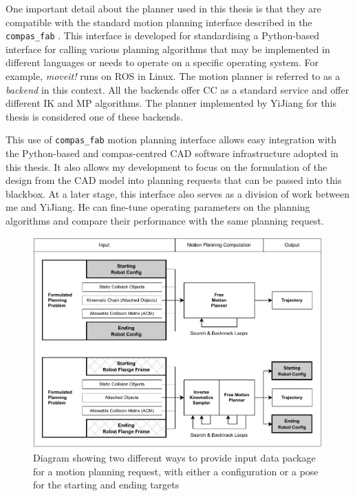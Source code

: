 One important detail about the planner used in this thesis is that they are compatible with the standard motion planning interface described in the \verb|compas_fab| \parencite{rustCOMPASFABRobotic2018}. This interface is developed for standardising a Python-based interface for calling various planning algorithms that may be implemented in different languages or needs to operate on a specific operating system. For example, \textit{moveit!} \parencite{sucanMoveit2018} runs on ROS \parencite{quigleyROSOpensourceRobot2009} in Linux. The motion planner is referred to as a \textit{backend} in this context. All the backends offer CC as a standard service and offer different IK and MP algorithms. The planner implemented by YiJiang \parencite{huangCompas_fab_pychoreo2023} for this thesis is considered one of these backends. 

This use of \verb|compas_fab| motion planning interface allows easy integration with the Python-based and compas-centred CAD software infrastructure adopted in this thesis. It also allows my development to focus on the formulation of the design from the CAD model into planning requests that can be passed into this blackbox. At a later stage, this interface also serves as a division of work between me and YiJiang. He can fine-tune operating parameters on the planning algorithms and compare their performance with the same planning request.

\begin{figure}[hb!]
    \centering
    \includegraphics[width=0.99\textwidth]{images/05/image102.pdf}
    \caption[Diagram showing two different ways to provide input data package for a motion planning request]{Diagram showing two different ways to provide input data package for a motion planning request, with either a configuration or a pose for the starting and ending targets}
    \label{fig:fmp-input-packet}
\end{figure}

